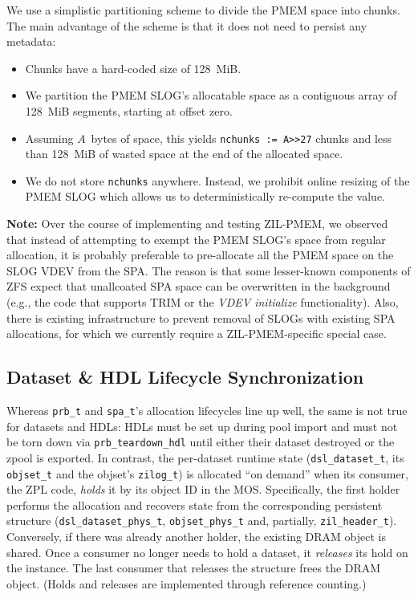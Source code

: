 \documentclass[12pt,a4paper,twoside]{book}
\begin{document}
We use a simplistic partitioning scheme to divide the PMEM space into chunks.
The main advantage of the scheme is that it does not need to persist any metadata:
\begin{itemize}[noitemsep]
    \item Chunks have a hard-coded size of 128~MiB.
    \item We partition the PMEM SLOG's allocatable space as a contiguous array of 128~MiB segments, starting at offset zero.
    \item Assuming $A$~bytes of space, this yields \lstinline{nchunks := A>>27} chunks and less than 128~MiB of wasted space at the end of the allocated space.
    \item We do not store \lstinline{nchunks} anywhere. Instead, we prohibit online resizing of the PMEM SLOG which allows us to deterministically re-compute the value.
\end{itemize}

\textbf{Note:} Over the course of implementing and testing ZIL-PMEM, we observed that instead of attempting to exempt the PMEM SLOG's space from regular allocation, it is probably preferable to pre-allocate all the PMEM space on the SLOG VDEV from the SPA.
The reason is that some lesser-known components of ZFS expect that unallcoated SPA space can be overwritten in the background (e.g., the code that supports TRIM or the \textit{VDEV initialize} functionality).
Also, there is existing infrastructure to prevent removal of SLOGs with existing SPA allocations, for which we currently require a ZIL-PMEM-specific special case.

\subsection{Dataset \& HDL Lifecycle Synchronization}\label{sec:zilpmem:hdllifecycle}
Whereas \lstinline{prb_t} and \lstinline{spa_t}'s allocation lifecycles line up well, the same is not true for datasets and HDLs:
HDLs must be set up during pool import and must not be torn down via \lstinline{prb_teardown_hdl} until either their dataset destroyed or the zpool is exported.
In contrast, the per-dataset runtime state (\lstinline{dsl_dataset_t}, its \lstinline{objset_t} and the objset's \lstinline{zilog_t}) is allocated ``on demand'' when its consumer, the ZPL code, \textit{holds} it by its object ID in the MOS.
Specifically, the first holder performs the allocation and recovers state from the corresponding persistent structure (\lstinline{dsl_dataset_phys_t}, \lstinline{objset_phys_t} and, partially, \lstinline{zil_header_t}).
Conversely, if there was already another holder, the existing DRAM object is shared.
Once a consumer no longer needs to hold a dataset, it \textit{releases} its hold on the instance.
The last consumer that releases the structure frees the DRAM object.
(Holds and releases are implemented through reference counting.)
\end{document}
